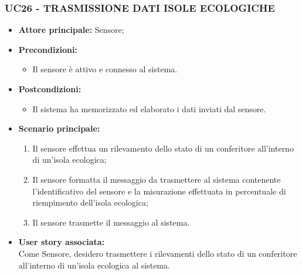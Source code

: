 \subsubsection{UC26 - TRASMISSIONE DATI ISOLE ECOLOGICHE}
\begin{itemize}
    \item \textbf{Attore principale:} Sensore;
    \item \textbf{Precondizioni:}
        \begin{itemize}
            \item Il sensore è attivo e connesso al sistema. 
        \end{itemize}
    \item \textbf{Postcondizioni:}
        \begin{itemize}
            \item Il sistema ha memorizzato ed elaborato i dati inviati dal sensore.
        \end{itemize}
    \item \textbf{Scenario principale:}
        \begin{enumerate}
            \item Il sensore effettua un rilevamento dello stato di un conferitore all'interno di un'isola ecologica;
            \item Il sensore formatta il messaggio da trasmettere al sistema contenente l'identificativo del sensore e la misurazione effettuata in percentuale di riempimento dell'isola ecologica;
            \item Il sensore trasmette il messaggio al sistema.
        \end{enumerate}
    \item \textbf{User story associata:} \\
    Come Sensore, desidero trasmettere i rilevamenti dello stato di un conferitore all'interno di un'isola ecologica al sistema.
\end{itemize}
